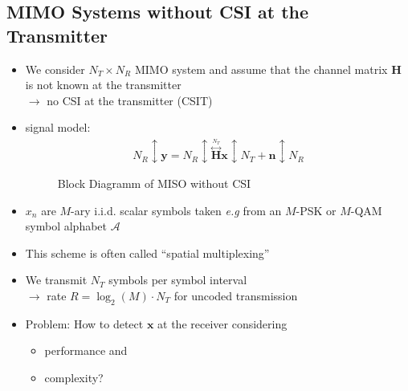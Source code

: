 \documentclass[a4paper, 10pt]{article}
\begin{document}
\subsection{MIMO Systems without CSI at the Transmitter}
\begin{itemize}
	\item We consider $N_T\times N_R$ MIMO system and assume that the channel matrix $\mathbf{H}$ is not known at the transmitter\\
	$\rightarrow$ no CSI at the transmitter (CSIT)
	\item signal model:
	\begin{align*}
		N_R \updownarrow\mathbf{y}=N_R \updownarrow \overset{\overset{N_T}{\longleftrightarrow}}{\mathbf{H}}\mathbf{x}\updownarrow N_T+\mathbf{n} \updownarrow N_R
	\end{align*}

\begin{figure}[ht]
	\centering
	
	\caption{Block Diagramm of MISO without CSI}
	\label{fig:SIGMOD.pstex_t}
\end{figure}

	\item $x_n$ are $M$-ary i.i.d. scalar symbols taken \textit{e.g} from an $M$-PSK or $M$-QAM symbol alphabet $\mathscr{A}$
	\item This scheme is often called ``spatial multiplexing''
	\item We transmit $N_T$ symbols per symbol interval\\
	$\rightarrow$ rate $R=\log_2(M)\cdot N_T$ for uncoded transmission
	\item Problem: How to detect $\mathbf{x}$ at the receiver considering
		\begin{itemize}
			\item performance and
			\item complexity?
		\end{itemize}
\end{itemize}
\end{document}
